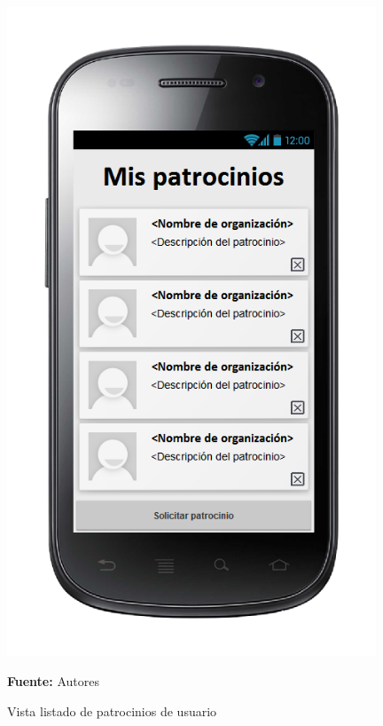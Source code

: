 \begin{figure}[!htb]
  \begin{center}
\includegraphics[width=11cm]{./imagenes/UI/Usuarios/listado_de_patrocinios_de_usuario.png}
    \caption{Vista listado de patrocinios de usuario}
    \label{fig:Vista_listado_de_patrocinios_de_usuario}
    \textbf{Fuente:}  Autores
  \end{center}
\end{figure}
